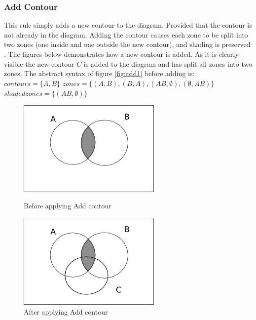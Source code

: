 \documentclass[10pt, a4paper, titlepage]{article}
\begin{document}
\subsubsection{Add Contour}
This rule simply adds a new contour to the diagram. Provided that the contour is not already in the diagram. Adding the contour causes each zone to be split into two zones (one inside and one outside the new contour), and shading is preserved \cite{Fish_2007}.
The figures below demonstrates how a new contour is added.
As it is clearly visible the new contour $ C $ is added to the diagram and has split all zones into two zones. The abstract syntax of figure \ref{fig:add1} before adding is:\newline
$contours =  \lbrace A, B \rbrace $ \newline
$zones = \lbrace (A , B) , (B , A), (AB , \emptyset) , (\emptyset , AB) \rbrace  $ \newline 
$shaded zones = \lbrace (AB , \emptyset) \rbrace  $ \newline

\begin{figure}[h]
\begin{minipage}[h]{0.5\linewidth}
\centering
\includegraphics[scale=0.5]{images/diag3add1.png}
\caption{Before applying Add contour}
\label{fig:add1}
\end{minipage}
\hspace{0.5cm}
\begin{minipage}[h]{0.5\linewidth}
\centering
\includegraphics[scale=0.5]{images/diag3add2.png}
\caption{After applying Add contour}
\label{fig:add2}
\end{minipage}
\end{figure}
\end{document}
